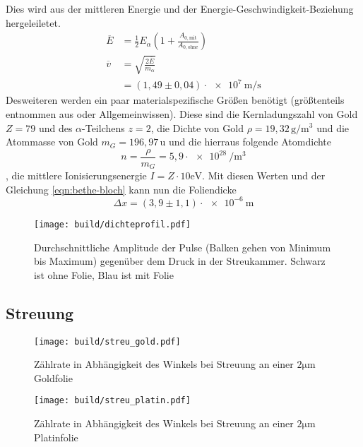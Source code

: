 Dies wird aus der mittleren Energie und der Energie-Geschwindigkeit-Beziehung hergeleiletet.
\begin{align}
  \overline{E} &= \frac{1}{2} E_{\alpha}\left(1 + \frac{A_{0,\text{mit}}}{A_{0,\text{ohne}}} \right)\\
  \overline{v} &= \sqrt{\frac{2\overline{E}}{m_{\alpha}}}\\
               &= (1,49 \pm 0,04)\cdot\SI{e+7}{\meter\per\second}
\end{align}
Desweiteren werden ein paar materialspezifische Größen benötigt (größtenteils entnommen aus \cite{Gold} oder Allgemeinwissen).
Diese sind die Kernladungszahl von Gold $Z=79$ und des $\alpha$-Teilchens $z=2$, die Dichte von Gold $\rho=19,32\, \si{\gram\per\meter\cubed}$
und die Atommasse von Gold $m_G=196,97\,\text{u}$ und die hierraus folgende Atomdichte
\begin{equation}
  n=\frac{\rho}{m_G}=5,9\cdot\SI{e+28}{\per\meter\cubed}
\end{equation}
, die mittlere Ionisierungsenergie $I=Z\cdot 10\si{\electronvolt}$.
Mit diesen Werten und der Gleichung \eqref{eqn:bethe-bloch} kann nun die Foliendicke
\begin{equation}
  \Delta x = (3,9 \pm 1,1)\cdot\SI{e-6}{\meter}
\end{equation}

\begin{figure}
  \centering
  \texttt{[image: build/dichteprofil.pdf]}
  \caption{Durchschnittliche Amplitude der Pulse (Balken gehen von Minimum bis Maximum) gegenüber dem Druck in der Streukammer. Schwarz ist ohne Folie, Blau ist mit Folie}
  \label{fig:dichteprofil}
\end{figure}

\subsection{Streuung}

\begin{figure}
  \centering
  \texttt{[image: build/streu\_gold.pdf]}
  \caption{Zählrate in Abhängigkeit des Winkels bei Streuung an einer $2\si{\micro\meter}$ Goldfolie}
  \label{fig:streu_gold}
\end{figure}

\begin{figure}
  \centering
  \texttt{[image: build/streu\_platin.pdf]}
  \caption{Zählrate in Abhängigkeit des Winkels bei Streuung an einer $2\si{\micro\meter}$ Platinfolie}
  \label{fig:streu_platin}
\end{figure}

